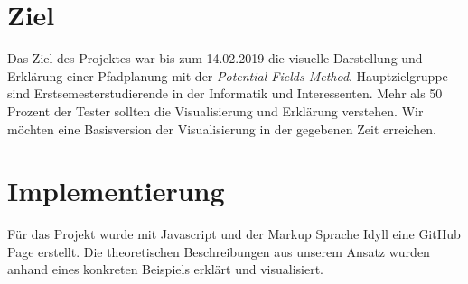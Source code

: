 

\section{Ziel}
Das Ziel des Projektes war bis zum 14.02.2019 die visuelle Darstellung und Erklärung einer Pfadplanung mit der \textit{Potential Fields Method}. Hauptzielgruppe sind Erstsemesterstudierende in der Informatik und Interessenten. Mehr als 50 Prozent der Tester sollten die Visualisierung und Erklärung verstehen. Wir möchten eine Basisversion der Visualisierung in der gegebenen Zeit erreichen.
\section{Implementierung}
Für das Projekt wurde mit Javascript und der Markup Sprache Idyll eine GitHub Page \cite{gitpage} erstellt.
Die theoretischen Beschreibungen aus unserem Ansatz wurden anhand eines konkreten Beispiels erklärt und visualisiert. 




